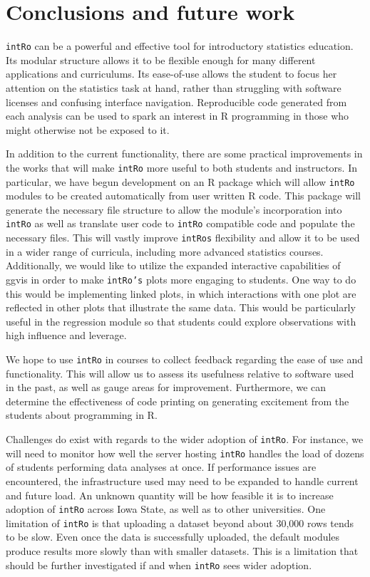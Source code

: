 \documentclass[12pt,]{article}
\begin{document}
\section{Conclusions and future work}\label{conclusions-and-future-work}

\texttt{intRo} can be a powerful and effective tool for introductory
statistics education. Its modular structure allows it to be flexible
enough for many different applications and curriculums. Its ease-of-use
allows the student to focus her attention on the statistics task at
hand, rather than struggling with software licenses and confusing
interface navigation. Reproducible code generated from each analysis can
be used to spark an interest in R programming in those who might
otherwise not be exposed to it.

In addition to the current functionality, there are some practical
improvements in the works that will make \texttt{intRo} more useful to
both students and instructors. In particular, we have begun development
on an R package which will allow \texttt{intRo} modules to be created
automatically from user written R code. This package will generate the
necessary file structure to allow the module's incorporation into
\texttt{intRo} as well as translate user code to \texttt{intRo}
compatible code and populate the necessary files. This will vastly
improve \texttt{intRo\textquotesingle{}s} flexibility and allow it to be
used in a wider range of curricula, including more advanced statistics
courses. Additionally, we would like to utilize the expanded interactive
capabilities of ggvis in order to make \texttt{intRo's} plots more
engaging to students. One way to do this would be implementing linked
plots, in which interactions with one plot are reflected in other plots
that illustrate the same data. This would be particularly useful in the
regression module so that students could explore observations with high
influence and leverage.

We hope to use \texttt{intRo} in courses to collect feedback regarding
the ease of use and functionality. This will allow us to assess its
usefulness relative to software used in the past, as well as gauge areas
for improvement. Furthermore, we can determine the effectiveness of code
printing on generating excitement from the students about programming in
R.

Challenges do exist with regards to the wider adoption of
\texttt{intRo}. For instance, we will need to monitor how well the
server hosting \texttt{intRo} handles the load of dozens of students
performing data analyses at once. If performance issues are encountered,
the infrastructure used may need to be expanded to handle current and
future load. An unknown quantity will be how feasible it is to increase
adoption of \texttt{intRo} across Iowa State, as well as to other
universities. One limitation of \texttt{intRo} is that uploading a
dataset beyond about 30,000 rows tends to be slow. Even once the data is
successfully uploaded, the default modules produce results more slowly
than with smaller datasets. This is a limitation that should be further
investigated if and when \texttt{intRo} sees wider adoption.
\end{document}
